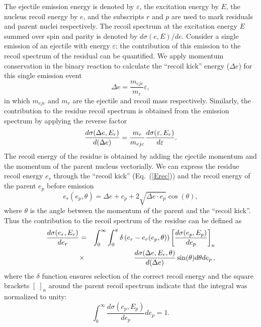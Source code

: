 The ejectile emission energy is denoted by $\varepsilon$, the
excitation energy by $E $, the nucleus recoil energy by $e$, and
the subscripts $r$ and $p$ are used to
mark residuals and parent nuclei respectively.
The recoil spectrum at the excitation energy $E$ summed over spin and
parity is denoted by $d\sigma(e,E)/de$.
Consider a single emission of an ejectile with energy $\varepsilon$;
the contribution of this emission to the recoil spectrum of the residual can
be quantified. We apply momentum conservation in the binary reaction to
calculate the {}``recoil kick'' energy ($\Delta e$) for this single emission
event
\begin{equation}
\Delta e=\frac{m_{ejc}}{m_{r}}\varepsilon,  \label{Erec}
\end{equation}
in which $m_{ejc}$ and $m_{r}$ are the ejectile and recoil mass
respectively. Similarly, the contribution to the residue recoil spectrum is
obtained from the emission spectrum by applying the reverse factor
\begin{equation}
\frac{d\sigma(\Delta e,E_{r})}{d(\Delta e)}=\frac{m_{r}}{m_{ejc}}\frac{%
d\sigma(\varepsilon,E_{r})}{d\varepsilon}.  \label{CSkick}
\end{equation}
The recoil energy of the residue is obtained by adding the ejectile momentum
and the momentum of the parent nucleus vectorially. We can express the
residue recoil energy $e_{r}$ through the {}``recoil kick'' (Eq.~(\ref{Erec}))
and the recoil energy of the parent $e_{p}$ before emission
\begin{equation}
e_{r}(e_{p},\theta)=\Delta e+e_{p}+2\sqrt{\Delta e\cdot e_{p}}\cos(\theta),
\label{Eresrec}
\end{equation}
\noindent where $\theta$ is the angle between the momentum of the parent and
the {}``recoil kick''. Thus the contribution to the recoil spectrum of the
residue can be defined as
\begin{eqnarray}
\frac{d\sigma(e_{r},E_{r})}{de_{r}}&=&\int_{0}^{\infty}\int_{0}^{\pi}\delta%
\left(e_{r}-e_{r}(e_{p},\theta)\right)\left[\frac{d\sigma(e_{p},E_{p})}{%
de_{p}}\right]_{n}  \notag \\
&\times&\frac{d\sigma(\Delta e,E_{r},\theta)}{d(\Delta e)}%
\sin(\theta)d\theta de_{p}\,,  \label{CSrec}
\end{eqnarray}
\noindent where the $\delta$ function ensures selection of the correct
recoil energy and the square brackets $\left[\;\right]_{n}$ around the parent
recoil spectrum indicate that the integral was normalized to unity:
\begin{equation}
\int_{0}^{\infty}\frac{d\sigma(e_{p},E_{p})}{de_{p}}de_{p}=1.
\end{equation}
